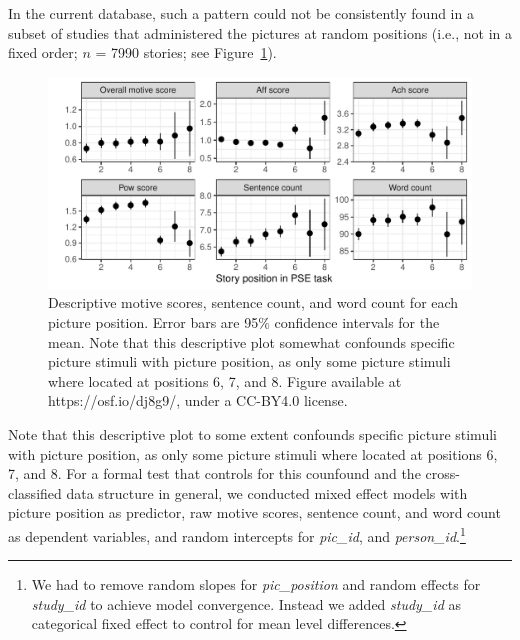 \documentclass[jou,a4paper]{apa6}\usepackage[]{graphicx}\usepackage[]{color}
\newenvironment{knitrout}{}{} %
\begin{document}
In the current database, such a pattern could not be consistently found in a subset of studies that administered the pictures at random positions (i.e., not in a fixed order; $n$ = 7990 stories; see Figure~\ref{fig:picPosPlot}). 

\begin{knitrout}
\color{fgcolor}\begin{figure}

{\centering \includegraphics[width=.9\textwidth]{figure/picPosPlot-1} 

}

\caption[Descriptive motive scores, sentence count, and word count for each picture position]{Descriptive motive scores, sentence count, and word count for each picture position. Error bars are 95\% confidence intervals for the mean. Note that this descriptive plot somewhat confounds specific picture stimuli with picture position, as only some picture stimuli where located at positions 6, 7, and 8. Figure available at https://osf.io/dj8g9/, under a CC-BY4.0 license.}\label{fig:picPosPlot}
\end{figure}


\end{knitrout}

Note that this descriptive plot to some extent confounds specific picture stimuli with picture position, as only some picture stimuli where located at positions 6, 7, and 8. For a formal test that controls for this counfound and the cross-classified data structure in general, we conducted mixed effect models with picture position as predictor, raw motive scores, sentence count, and word count as dependent variables, and random intercepts for \emph{pic\_id}, and \emph{person\_id}.\footnote{We had to remove random slopes for \emph{pic\_position} and random effects for \emph{study\_id} to achieve model convergence. Instead we added \emph{study\_id} as categorical fixed effect to control for mean level differences.} 
\end{document}
